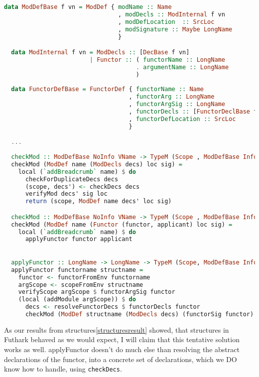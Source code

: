 \begin{lstlisting}[language=Haskell]
  data ModDefBase f vn = ModDef { modName :: Name
                                , modDecls :: ModInternal f vn
                                , modDefLocation  :: SrcLoc
                                , modSignature :: Maybe LongName
                                }

  data ModInternal f vn = ModDecls :: [DecBase f vn]
                        | Functor :: ( functorName :: LongName
                                     . argumentName :: LongName
                                     )
  
  data FunctorDefBase = FunctorDef { functorName :: Name
                                   , functorArg :: LongName
                                   , functorArgSig :: LongName
                                   , functorDecls :: [FunctorDeclBase f vn]
                                   , functorDefLocation :: SrcLoc
                                   }

  ...
                                     
  checkMod :: ModDefBase NoInfo VName -> TypeM (Scope , ModDefBase Info VName)
  checkMod (ModDef name (ModDecls decs) loc sig) =
    local (`addBreadcrumb` name) $ do
      checkForDuplicateDecs decs
      (scope, decs') <- checkDecs decs
      verifyMod decs' sig loc
      return (scope, ModDef name decs' loc sig)

  checkMod :: ModDefBase NoInfo VName -> TypeM (Scope , ModDefBase Info VName)
  checkMod (ModDef name (Functor (functor, applicant) loc sig) =
    local (`addBreadcrumb` name) $ do
      applyFunctor functor applicant

  
  applyFunctor :: LongName -> LongName -> TypeM (Scope, ModDefBase Info VName)
  applyFunctor functorname structname =
    functor <- functorFromEnv functorname
    argScope <- scopeFromEnv structname    
    verifyScope argScope $ functorArgSig functor
    (local (addModule argScope)) $ do
      decs <- resolveFunctorDecs $ functorDecls functor
      checkMod (ModDef structname (ModDecls decs) (functorSig functor) (functorDefLocation functor))
\end{lstlisting}

As our results from structures\ref{structuresresult} showed, that structures in
Futhark behaved as we would expect, I will claim that this tentative solution
works as well.
applyFunctor doesn't do much else than resolving the abstract declarations of
the functor, into a concrete set of declarations, which we DO know how to
handle, using \texttt{checkDecs}.